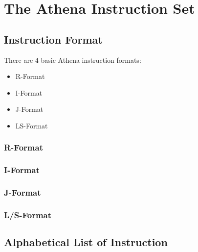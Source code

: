 \chapter{The Athena Instruction Set}

\section{Instruction Format}

There are 4 basic Athena instruction formats:
\begin{itemize}
    \item R-Format
    \item I-Format
    \item J-Format
    \item LS-Format
\end{itemize}

\subsection{R-Format}


\subsection{I-Format}


\subsection{J-Format}


\subsection{L/S-Format}


\section{Alphabetical List of Instruction}

